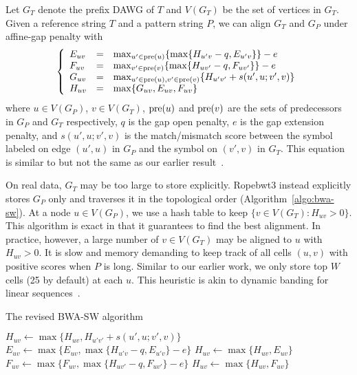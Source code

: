 \documentclass[webpdf,contemporary,large,namedate]{oup-authoring-template}%
\begin{document}
Let $G_T$ denote the prefix DAWG of $T$ and $V(G_T)$ be the set of vertices in $G_T$.
Given a reference string $T$ and a pattern string $P$, we can align $G_T$ and $G_P$ under affine-gap penalty with
$$
\left\{\begin{array}{lll}
E_{uv}&=&\max_{u'\in{\rm pre}(u)}\{\max\{H_{u'v}-q,E_{u'v}\}\}-e\\
F_{uv}&=&\max_{v'\in{\rm pre}(v)}\{\max\{H_{uv'}-q,F_{uv'}\}\}-e\\
G_{uv}&=&\max_{u'\in{\rm pre}(u),v'\in{\rm pre}(v)}\{H_{u'v'}+s(u',u;v',v)\}\\
H_{uv}&=&\max\{G_{uv},E_{uv},F_{uv}\}\\
\end{array}\right.
$$
where $u\in V(G_P)$, $v\in V(G_T)$,
${\rm pre}(u)$ and ${\rm pre}(v)$ are the sets of predecessors in $G_P$ and $G_T$ respectively,
$q$ is the gap open penalty, $e$ is the gap extension penalty,
and $s(u',u;v',v)$ is the match/mismatch score between the symbol labeled on edge $(u',u)$ in $G_P$
and the symbol on $(v',v)$ in $G_T$.
This equation is similar to but not the same as our earlier result~\citep{Li:2010fk}.

On real data, $G_T$ may be too large to store explicitly.
Ropebwt3 instead explicitly stores $G_P$ only and traverses it in the topological order (Algorithm~\ref{algo:bwa-sw}).
At a node $u\in V(G_P)$, we use a hash table to keep $\{v\in V(G_T):H_{uv}>0\}$.
This algorithm is exact in that it guarantees to find the best alignment.
In practice, however, a large number of $v\in V(G_T)$ may be aligned to $u$ with $H_{uv}>0$.
It is slow and memory demanding to keep track of all cells $(u,v)$ with positive scores when $P$ is long.
Similar to our earlier work, we only store top $W$ cells (25 by default) at each $u$.
This heuristic is akin to dynamic banding for linear sequences~\citep{Suzuki:2018aa}.

\begin{algorithm}[tb]
	\caption{The revised BWA-SW algorithm}\label{algo:bwa-sw}
	\begin{algorithmic}[1]
							\State $H_{uv}\gets \max\{H_{uv},H_{u'v'}+s(u',u;v',v)\}$
						\EndFor
					\EndFor
						\State $E_{uv}\gets\max\{E_{uv},\max\{H_{u'v}-q,E_{u'v}\}-e\}$
						\State $H_{uv}\gets\max\{H_{uv},E_{uv}\}$
					\EndFor
				\EndFor
						\State $F_{uv}\gets\max\{F_{uv},\max\{H_{uv'}-q,F_{uv'}\}-e\}$
						\State $H_{uv}\gets\max\{H_{uv},F_{uv}\}$
					\EndFor
				\EndFor
			\EndFor
		\EndProcedure
	\end{algorithmic}
\end{algorithm}
\end{document}
